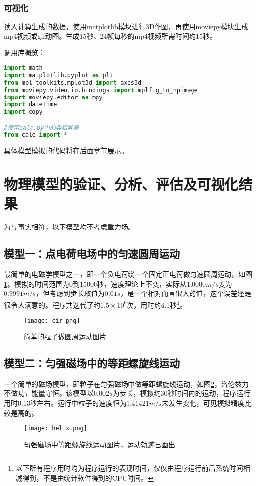 \documentclass[UTF-8,cs4size]{ctexart}
\begin{document}
\subsubsection{可视化}
读入计算生成的数据，使用matplotlib模块进行3D作图，再使用moviepy模块生成mp4视频或gif动图。生成15秒、24帧每秒的mp4视频所需时间约15秒。


调用库概览：
\begin{lstlisting}[language=Python]
import math
import matplotlib.pyplot as plt
from mpl_toolkits.mplot3d import axes3d
from moviepy.video.io.bindings import mplfig_to_npimage
import moviepy.editor as mpy
import datetime
import copy

#使用calc.py中的类和常量
from calc import *
\end{lstlisting}
具体模型模拟的代码将在后面章节展示。
\section{物理模型的验证、分析、评估及可视化结果}
为与事实相符，以下模型均不考虑重力场。
\subsection{模型一：点电荷电场中的匀速圆周运动}
最简单的电磁学模型之一，即一个负电荷绕一个固定正电荷做匀速圆周运动，如图\ref{fig:cir}。模拟的时间范围为0到15000秒，速度理论上不变，实际从$1.0000m/s$变为$0.9991m/s$，但考虑到步长取值为$0.01s$，是一个相对而言很大的值，这个误差还是很令人满意的。程序共迭代了约$1.5\times10^6$次，用时约4.1秒\footnote{以下所有程序用时均为程序运行的表观时间，仅仅由程序运行前后系统时间相减得到，不是由统计软件得到的CPU时间。}。
\begin{figure}[h!]
	\centering
	\texttt{[image: cir.png]}
	\caption{简单的粒子做圆周运动图片}
	\label{fig:cir}
\end{figure}
\subsection{模型二：匀强磁场中的等距螺旋线运动}
一个简单的磁场模型，即粒子在匀强磁场中做等距螺旋线运动，如图\ref{fig:helix}，洛伦兹力不做功，能量守恒。该模型以$0.002s$为步长，模拟约30秒时间内的运动，程序运行用时0.13秒左右。运行中粒子的速度恒为$1.41421m/s$未发生变化，可见模拟精度比较是高的。
\begin{figure}[h!]
	\centering
	\texttt{[image: helix.png]}
	\caption{匀强磁场中等距螺旋线运动图片，运动轨迹已画出}
	\label{fig:helix}
\end{figure}
\end{document}
